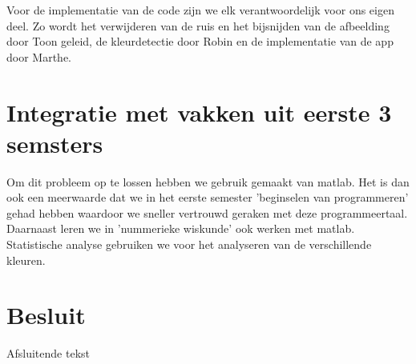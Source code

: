 \documentclass[a4paper,kulak]{kulakarticle}
\begin{document}
		Voor de implementatie van de code zijn we elk verantwoordelijk voor ons eigen deel. Zo wordt het verwijderen van de ruis en het bijsnijden van de afbeelding door Toon geleid, de kleurdetectie door Robin en de implementatie van de app door Marthe.
		
	\section{Integratie met vakken uit eerste 3 semsters}
		Om dit probleem op te lossen hebben we gebruik gemaakt van matlab. Het is dan ook een meerwaarde dat we in het eerste semester 'beginselen van programmeren' gehad hebben waardoor we sneller vertrouwd geraken met deze programmeertaal. Daarnaast leren we in 'nummerieke wiskunde' ook werken met matlab. Statistische analyse gebruiken we voor het analyseren van de verschillende kleuren.
	
	\section*{Besluit}	
		Afsluitende tekst
\end{document}
